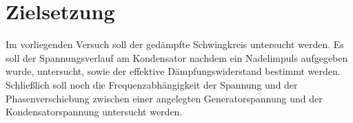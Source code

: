\section{Zielsetzung}
\label{sec:Zielsetzung}
Im vorliegenden Versuch soll der gedämpfte Schwingkreis untersucht werden.
Es soll der Spannungsverlauf am Kondensator nachdem ein Nadelimpuls aufgegeben wurde, untersucht, sowie der effektive Dämpfungswiderstand bestimmt werden.
Schließlich soll noch die Frequenzabhängigkeit der Spannung und der Phasenverschiebung zwischen einer angelegten Generatorspannung und der Kondensatorspannung untersucht werden.
